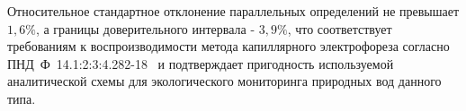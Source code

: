 Относительное стандартное отклонение параллельных определений не превышает $1{,}6\%$, а границы доверительного интервала - $3{,}9\%$, что соответствует требованиям к воспроизводимости метода капиллярного электрофореза согласно ПНД~Ф~14.1:2:3:4.282-18~\cite{pndf14123428218} и подтверждает пригодность используемой аналитической схемы для экологического мониторинга природных вод данного типа.
